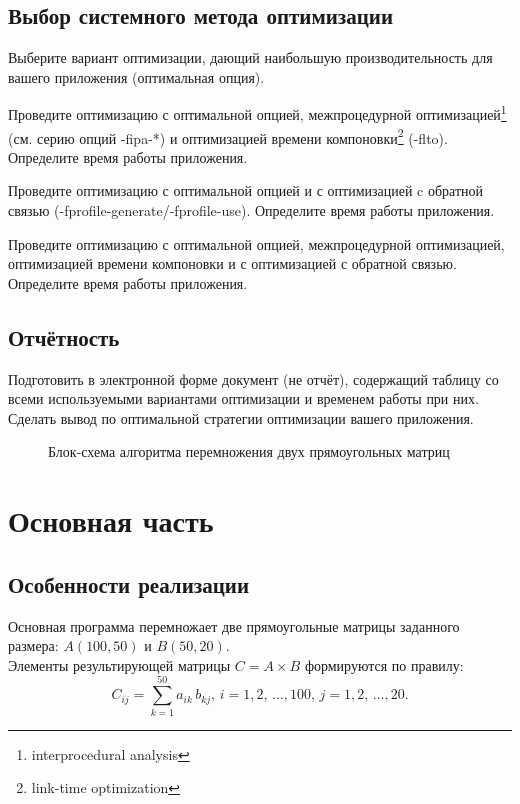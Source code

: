 \documentclass[a4paper, 12pt] {article}
\begin{document}
\subsection{Выбор системного метода оптимизации}
  Выберите вариант оптимизации, дающий наибольшую производительность для вашего приложения (оптимальная опция).\smallskip
  
  Проведите оптимизацию с оптимальной опцией, межпроцедурной оптимизацией\footnote{interprocedural analysis} (см. серию опций -fipa-*) и оптимизацией времени компоновки\footnote{link-time optimization} (-flto). Определите время работы приложения.\smallskip
  
  Проведите оптимизацию с оптимальной опцией и с оптимизацией c
обратной связью (-fprofile-generate/-fprofile-use). Определите время
работы приложения.\smallskip
  
  Проведите оптимизацию с оптимальной опцией, межпроцедурной
оптимизацией, оптимизацией времени компоновки и с оптимизацией с обратной связью. Определите время работы приложения.

\subsection{Отчётность}
  Подготовить в электронной форме документ (не отчёт), содержащий
таблицу со всеми используемыми вариантами оптимизации и временем работы при них. Сделать вывод по оптимальной стратегии оптимизации вашего приложения.


\begin{figure}
	{\fontsize{8}{16}
	\centering
	
	\caption{Блок-схема алгоритма перемножения двух прямоугольных матриц}
}
\end{figure}

\section{Основная часть}
\subsection{Особенности реализации}
  Основная программа перемножает две прямоугольные матрицы заданного
размера: $A(100, 50)$ и $B(50, 20).$  \\
Элементы результирующей матрицы $C=A \times B$ формируются по правилу:
   \begin{equation}\label{formula_01}
   C_{ij}=\sum_{k=1}^{50}a_{ik}\, b_{kj},\, i=1,2,\, \ldots,100,\, j=1,2,\, \ldots,20.
   \end{equation}
\end{document}
